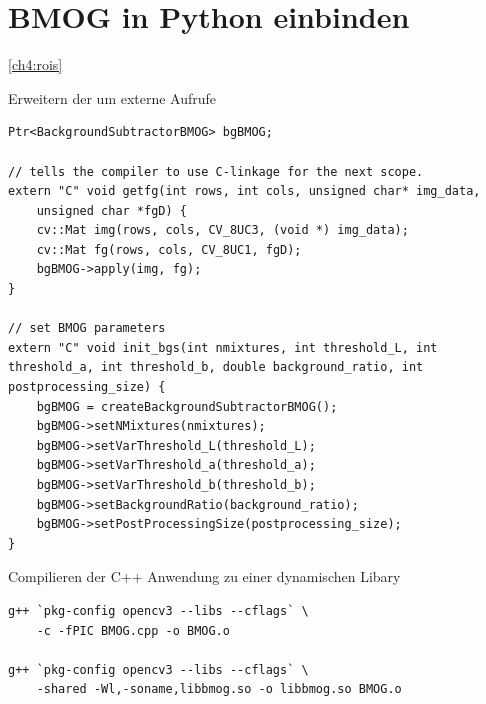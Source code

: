 \section{BMOG in Python einbinden} \label{ap:bmog}
\autoref{ch4:rois}

\begin{code}
\caption{Erweitern der  um externe Aufrufe }
\begin{verbatim}
Ptr<BackgroundSubtractorBMOG> bgBMOG;

// tells the compiler to use C-linkage for the next scope.
extern "C" void getfg(int rows, int cols, unsigned char* img_data,
    unsigned char *fgD) {
    cv::Mat img(rows, cols, CV_8UC3, (void *) img_data);
    cv::Mat fg(rows, cols, CV_8UC1, fgD);
    bgBMOG->apply(img, fg);
}

// set BMOG parameters
extern "C" void init_bgs(int nmixtures, int threshold_L, int threshold_a, int threshold_b, double background_ratio, int postprocessing_size) {
	bgBMOG = createBackgroundSubtractorBMOG();
    bgBMOG->setNMixtures(nmixtures);
    bgBMOG->setVarThreshold_L(threshold_L);
    bgBMOG->setVarThreshold_a(threshold_a);
    bgBMOG->setVarThreshold_b(threshold_b);
    bgBMOG->setBackgroundRatio(background_ratio);
    bgBMOG->setPostProcessingSize(postprocessing_size);
}
\end{verbatim}
\end{code}

\begin{code}
\caption{Compilieren der \textsc{C++} Anwendung zu einer dynamischen Libary }
\begin{verbatim}
g++ `pkg-config opencv3 --libs --cflags` \
    -c -fPIC BMOG.cpp -o BMOG.o

g++ `pkg-config opencv3 --libs --cflags` \
	-shared -Wl,-soname,libbmog.so -o libbmog.so BMOG.o
\end{verbatim}
\end{code}


